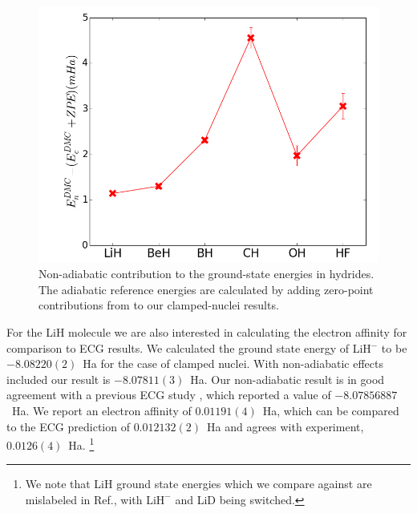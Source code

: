 \documentclass[pra,superscriptaddress,groupedaddress,twocolumn]{revtex4}
\begin{document}
\begin{figure}[h]
\includegraphics[scale=.37]{Figures/dia-nad-ad}
\caption{Non-adiabatic contribution to the ground-state energies in hydrides. The adiabatic reference energies are calculated by adding zero-point contributions from \cite{Feller_Corrections} to our clamped-nuclei results. \label{fig:dia-nad-ad}}
\end{figure}

For the LiH molecule we are also interested in calculating the electron affinity for comparison to ECG results. We calculated the ground state energy of LiH$^-$ to be $-8.08220(2)$~Ha for the case of clamped nuclei.  With non-adiabatic effects included our result is  $-8.07811(3)$~Ha. Our non-adiabatic result is in good agreement with a previous ECG study \cite{Bubin_LiH_noBO}, which reported a value of $-8.07856887$~Ha. We report an electron affinity of $0.01191(4)$~Ha, which can be compared to the ECG prediction of $0.012132(2)$~Ha and agrees with experiment, $0.0126(4)$~Ha. \footnote{We note that LiH ground state energies which we compare against are mislabeled in Ref.\cite{Bubin_LiH_noBO}, with $\text{LiH}^-$ and LiD being switched.}


\end{document}
